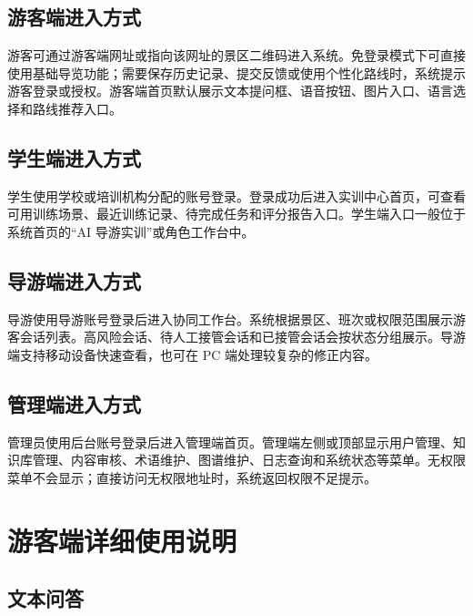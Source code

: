 \subsection{游客端进入方式}

游客可通过游客端网址或指向该网址的景区二维码进入系统。免登录模式下可直接使用基础导览功能；需要保存历史记录、提交反馈或使用个性化路线时，系统提示游客登录或授权。游客端首页默认展示文本提问框、语音按钮、图片入口、语言选择和路线推荐入口。


\subsection{学生端进入方式}

学生使用学校或培训机构分配的账号登录。登录成功后进入实训中心首页，可查看可用训练场景、最近训练记录、待完成任务和评分报告入口。学生端入口一般位于系统首页的“AI 导游实训”或角色工作台中。


\subsection{导游端进入方式}

导游使用导游账号登录后进入协同工作台。系统根据景区、班次或权限范围展示游客会话列表。高风险会话、待人工接管会话和已接管会话会按状态分组展示。导游端支持移动设备快速查看，也可在 PC 端处理较复杂的修正内容。


\subsection{管理端进入方式}

管理员使用后台账号登录后进入管理端首页。管理端左侧或顶部显示用户管理、知识库管理、内容审核、术语维护、图谱维护、日志查询和系统状态等菜单。无权限菜单不会显示；直接访问无权限地址时，系统返回权限不足提示。


\section{游客端详细使用说明}

\subsection{文本问答}

